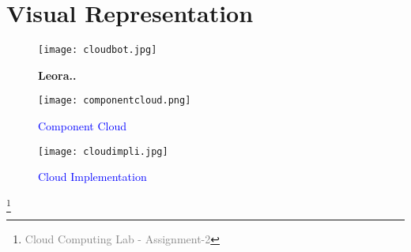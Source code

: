 \documentclass[12pt]{article}
\begin{document}
\section{Visual Representation}
\begin{figure}[htp]
    \centering
    \texttt{[image: cloudbot.jpg]} %
    \caption{\textbf{Leora..}}
    \label{fig:image1}
\end{figure}

\begin{figure}[htp]
    \centering
    \texttt{[image: componentcloud.png]} %
    \caption{\textcolor{blue}{Component Cloud}}
    \label{fig:image2}
\end{figure}

\begin{figure}[htp]
    \centering
    \texttt{[image: cloudimpli.jpg]} %
    \caption{\textcolor{blue}{Cloud Implementation}}
    \label{fig:image3}
\end{figure}

\footnote{\textcolor{gray}{Cloud Computing Lab - Assignment-2}}
\end{document}
